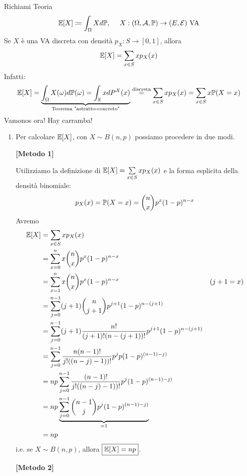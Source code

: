 Richiami Teoria
\begin{equation*}
\mathbb{E}[X] \coloneqq \int_{\Omega } Xd\mathbb{P} ,\ \ \ \ X:(\Omega ,\mathcal{A} ,\mathbb{P})\rightarrow (E,\mathcal{E}) \ \text{VA}
\end{equation*}
Se $X$ è una VA discreta con densità $p_{X} :S\rightarrow [0,1]$, allora
\begin{equation*}
\mathbb{E}[X] =\sum\limits_{x\in S} xp_{X}(x)
\end{equation*}
Infatti:
\begin{equation*}
\mathbb{E}[X] =\underbrace{\int_{\Omega } X(\omega) d\mathbb{P}(\omega) =\int_{\mathbb{R}} xdP^{X}(x)}_{\text{Teorema "astratto-concreto"}}\overset{\text{discreta}}{=}\sum\limits_{x\in S} xp_{X}(x) =\sum\limits_{x\in S} x\mathbb{P}(X=x)
\end{equation*}
Vamonos ora! Hay carramba!
\begin{enumerate}
\item Per calcolare $\mathbb{E}[X]$, con $X\sim B(n,p)$ possiamo procedere in due modi.

\textbf{[Metodo 1]}

Utilizziamo la definizione di $\mathbb{E}[X] =\sum\limits_{x\in S} xp_{X}(x)$ e la forma esplicita della densità binomiale:
\begin{equation*}
p_{X}(x) =\mathbb{P}(X=x) =\binom{n}{x} p^{x}(1-p)^{n-x}
\end{equation*}
Avremo
\begin{align*}
\mathbb{E}[X] & =\sum\limits_{x\in S} xp_{X}(x) & \\
 & =\sum\limits_{x=0}^{n} x\binom{n}{x} p^{x}(1-p)^{n-x} & \\
 & =\sum\limits_{x=1}^{n} x\binom{n}{x} p^{x}(1-p)^{n-x} & (j+1=x)\\
 & =\sum\limits_{j=0}^{n-1}(j+1)\binom{n}{j+1} p^{j+1}(1-p)^{n-(j+1)} & \\
 & =\sum\limits_{j=0}^{n-1}(j+1)\frac{n!}{(j+1) !(n-(j+1)) !} p^{j+1}(1-p)^{n-(j+1)} & \\
 & =\sum\limits_{j=0}^{n-1}\frac{n(n-1) !}{j!((n-j) -1)) !} p^{j} p(1-p)^{(n-1) -j)} & \\
 & =np\sum\limits_{j=0}^{n-1}\frac{(n-1) !}{j!((n-j) -1)) !} p^{j}(1-p)^{(n-1) -j)} & \\
 & =np\underbrace{\sum\limits_{j=0}^{n-1}\binom{n-1}{j} p^{j}(1-p)^{(n-1) -j)}}_{=1} & \\
 & =np & 
\end{align*}
i.e. se $X\sim B(n,p)$, allora $\boxed{\mathbb{E}[X] =np}$.

\textbf{[Metodo 2]}


\end{enumerate}
